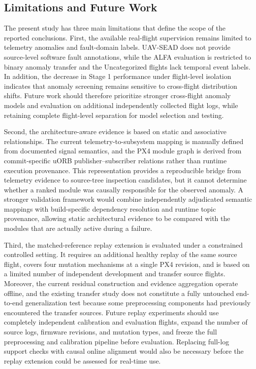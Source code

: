 \subsection{Limitations and Future Work}

The present study has three main limitations that define the scope of the reported conclusions. First, the available real-flight supervision remains limited to telemetry anomalies and fault-domain labels. UAV-SEAD does not provide source-level software fault annotations, while the ALFA evaluation is restricted to binary anomaly transfer and the Uncategorized flights lack temporal event labels. In addition, the decrease in Stage 1 performance under flight-level isolation indicates that anomaly screening remains sensitive to cross-flight distribution shifts. Future work should therefore prioritize stronger cross-flight anomaly models and evaluation on additional independently collected flight logs, while retaining complete flight-level separation for model selection and testing.

Second, the architecture-aware evidence is based on static and associative relationships. The current telemetry-to-subsystem mapping is manually defined from documented signal semantics, and the PX4 module graph is derived from commit-specific uORB publisher--subscriber relations rather than runtime execution provenance. This representation provides a reproducible bridge from telemetry evidence to source-tree inspection candidates, but it cannot determine whether a ranked module was causally responsible for the observed anomaly. A stronger validation framework would combine independently adjudicated semantic mappings with build-specific dependency resolution and runtime topic provenance, allowing static architectural evidence to be compared with the modules that are actually active during a failure.

Third, the matched-reference replay extension is evaluated under a constrained controlled setting. It requires an additional healthy replay of the same source flight, covers four mutation mechanisms at a single PX4 revision, and is based on a limited number of independent development and transfer source flights. Moreover, the current residual construction and evidence aggregation operate offline, and the existing transfer study does not constitute a fully untouched end-to-end generalization test because some preprocessing components had previously encountered the transfer sources. Future replay experiments should use completely independent calibration and evaluation flights, expand the number of source logs, firmware revisions, and mutation types, and freeze the full preprocessing and calibration pipeline before evaluation. Replacing full-log support checks with causal online alignment would also be necessary before the replay extension could be assessed for real-time use.

